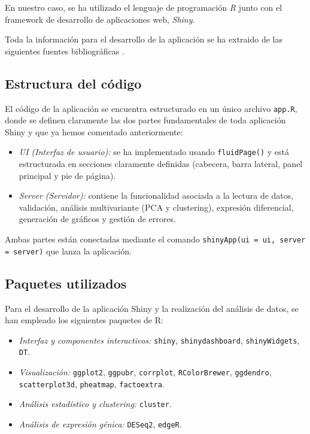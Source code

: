 En nuestro caso, se ha utilizado el lenguaje de programación \textit{R} junto con el framework de desarrollo de aplicaciones web, \textit{Shiny}. \newline

Toda la información para el desarrollo de la aplicación se ha extraido de las siguientes fuentes bibliográficas \cite{shiny-basics,shiny-gallery,shiny-html-tags,shiny-layout,shiny-programming-historian,shiny-layout-guide}.



\subsection{Estructura del código}

El código de la aplicación se encuentra estructurado en un único archivo \texttt{app.R}, donde se definen claramente las dos partes fundamentales de 
toda aplicación Shiny y que ya hemos comentado anteriormente:

\begin{itemize}
    \item \textit{UI (Interfaz de usuario):} se ha implementado usando \texttt{fluidPage()} y está estructurada en secciones claramente definidas 
    (cabecera, barra lateral, panel principal y pie de página).
    \item \textit{Server (Servidor):} contiene la funcionalidad asociada a la lectura de datos, validación, análisis multivariante (PCA y clustering), 
    expresión diferencial, generación de gráficos y gestión de errores.
\end{itemize}

Ambas partes están conectadas mediante el comando \texttt{shinyApp(ui = ui, server = server)} que lanza la aplicación.

\subsection{Paquetes utilizados}

Para el desarrollo de la aplicación Shiny y la realización del análisis de datos, se han empleado los siguientes paquetes de R:

\begin{itemize}
    \item \textit{Interfaz y componentes interactivos:} \texttt{shiny}, \texttt{shinydashboard}, \texttt{shinyWidgets}, \texttt{DT}.
    \item \textit{Visualización:} \texttt{ggplot2}, \texttt{ggpubr}, \texttt{corrplot}, \texttt{RColorBrewer}, \texttt{ggdendro}, \texttt{scatterplot3d}, \texttt{pheatmap}, \texttt{factoextra}.
    \item \textit{Análisis estadístico y clustering:} \texttt{cluster}.
    \item \textit{Análisis de expresión génica:} \texttt{DESeq2}, \texttt{edgeR}.
\end{itemize}

